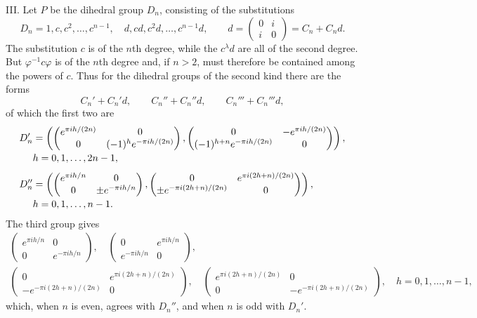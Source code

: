 \documentclass[11pt]{article}
\begin{document}
III. Let $P$ be the dihedral group $D_n$, consisting of the substitutions
\begin{equation}
 D_n=1,c,c^2,\ldots,c^{n-1},\quad
 d,cd,c^2d,\ldots,c^{n-1}d,\qquad
 d=\begin{pmatrix}0&i\\ i&0\end{pmatrix}=C_n+C_nd.
 \tag{8}
\end{equation}
The substitution $c$ is of the $n$th degree, while the $c^\lambda d$ are all of the second degree. But $\varphi^{-1}c\varphi$ is of the $n$th degree and, if $n>2$, must therefore be contained among the powers of $c$. Thus for the dihedral groups of the second kind there are the forms
\begin{equation}
 C_n'+C_n'd,\qquad C_n''+C_n''d,\qquad C_n'''+C_n'''d, \tag{9}
\end{equation}
of which the first two are
\[
\begin{aligned}
D_n'&=\left(
\begin{pmatrix}e^{\pi i h/(2n)}&0\\0&(-1)^h e^{-\pi i h/(2n)}\end{pmatrix},
\begin{pmatrix}0&-e^{\pi i h/(2n)}\\ (-1)^{h+n}e^{-\pi i h/(2n)}&0\end{pmatrix}
\right),\\[-0.2em]
&\hfill h=0,1,\ldots,2n-1,\\[0.4em]
D_n''&=\left(
\begin{pmatrix}e^{\pi i h/n}&0\\0&\pm e^{-\pi i h/n}\end{pmatrix},
\begin{pmatrix}0&e^{\pi i(2h+n)/(2n)}\\
 \pm e^{-\pi i(2h+n)/(2n)}&0\end{pmatrix}
\right),\\[-0.2em]
&\hfill h=0,1,\ldots,n-1.
\end{aligned}
\]
The third group gives
\[
\begin{gathered}
 \begin{pmatrix}e^{\pi i h/n}&0\\0&e^{-\pi i h/n}\end{pmatrix},\quad
 \begin{pmatrix}0&e^{\pi i h/n}\\e^{-\pi i h/n}&0\end{pmatrix},\\
 \begin{pmatrix}0&e^{\pi i(2h+n)/(2n)}\\-e^{-\pi i(2h+n)/(2n)}&0\end{pmatrix},\quad
 \begin{pmatrix}e^{\pi i(2h+n)/(2n)}&0\\0&-e^{-\pi i(2h+n)/(2n)}\end{pmatrix},
 \quad h=0,1,\ldots,n-1,
\end{gathered}
\]
which, when $n$ is even, agrees with $D_n''$, and when $n$ is odd with $D_n'$.
\end{document}

